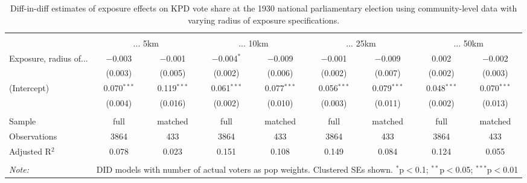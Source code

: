 
\begin{table}[!htbp] \centering 
  \caption{Diff-in-diff estimates of exposure effects on KPD vote share at the 1930 national parliamentary election using community-level data with varying radius of exposure specifications.\vspace{-.25cm}} 
  \label{tab:kpd-voteshare-radius-dd} 
\scriptsize 
\begin{tabular}{@{\extracolsep{5pt}}lcccccccc} 
\\[-1.8ex]\hline 
\hline \\[-1.8ex] 
 & \multicolumn{2}{c}{... 5km} & \multicolumn{2}{c}{... 10km} & \multicolumn{2}{c}{... 25km} & \multicolumn{2}{c}{... 50km} \\ 
 \cmidrule(r){2-3}\cmidrule(r){4-5}\cmidrule(r){6-7}\cmidrule(r){8-9}Exposure, radius of... & $-$0.003 & $-$0.001 & $-$0.004$^{*}$ & $-$0.009 & $-$0.001 & $-$0.009 & 0.002 & $-$0.002 \\ 
  & (0.003) & (0.005) & (0.002) & (0.006) & (0.002) & (0.007) & (0.002) & (0.003) \\ 
  (Intercept) & 0.070$^{***}$ & 0.119$^{***}$ & 0.061$^{***}$ & 0.077$^{***}$ & 0.056$^{***}$ & 0.079$^{***}$ & 0.048$^{***}$ & 0.070$^{***}$ \\ 
  & (0.004) & (0.016) & (0.002) & (0.010) & (0.003) & (0.011) & (0.002) & (0.013) \\ 
 \hline \\[-1.8ex] 
Sample & full & matched & full & matched & full & matched & full & matched \\ 
Observations & 3864 & 433 & 3864 & 433 & 3864 & 433 & 3864 & 433 \\ 
Adjusted R$^{2}$ & 0.078 & 0.023 & 0.151 & 0.108 & 0.149 & 0.084 & 0.124 & 0.055 \\ 
\hline 
\hline \\[-1.8ex] 
\textit{Note:}  & \multicolumn{8}{r}{DID models with number of actual voters as pop weights. Clustered SEs shown. $^{*}$p$<$0.1; $^{**}$p$<$0.05; $^{***}$p$<$0.01} \\ 
\end{tabular} 
\end{table} 
